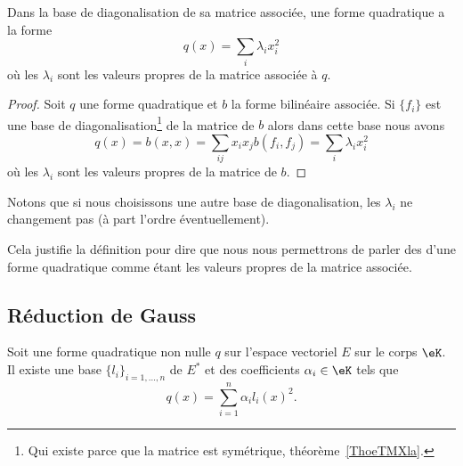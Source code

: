\begin{proposition}\label{PropFWYooQXfcVY}
    Dans la base de diagonalisation de sa matrice associée, une forme quadratique a la forme
    \begin{equation}
        q(x)=\sum_i\lambda_ix_i^2
    \end{equation}
    où les \( \lambda_i\) sont les valeurs propres de la matrice associée à \( q\).
\end{proposition}

\begin{proof}
    Soit \( q\) une forme quadratique et \( b\) la forme bilinéaire associée. Si \( \{ f_i \}\) est une base de diagonalisation\footnote{Qui existe parce que la matrice est symétrique, théorème~\ref{ThoeTMXla}.} de la matrice de \( b\) alors dans cette base nous avons
\begin{equation}
    q(x)=b(x,x)=\sum_{ij}x_ix_jb(f_i,f_j)=\sum_i\lambda_ix_i^2
\end{equation}
où les \( \lambda_i\) sont les valeurs propres de la matrice de \( b\).
\end{proof}

Notons que si nous choisissons une autre base de diagonalisation, les \( \lambda_i\) ne changement pas (à part l'ordre éventuellement). 

Cela justifie la définition pour dire que nous nous permettrons de parler des  d'une forme quadratique comme étant les valeurs propres de la matrice associée.

\subsection{Réduction de Gauss}

\begin{theorem}     \label{THOooOMMFooKxqICS}
    Soit une forme quadratique non nulle \( q\) sur l'espace vectoriel \( E\) sur le corps \( \eK\). Il existe une base  \(\{ l_i \}_{i=1,\ldots, n}\) de \( E^*\) et des coefficients \( \alpha_i\in \eK\) tels que 
        \begin{equation}
            q(x)=\sum_{i=1}^n\alpha_il_i(x)^2.
        \end{equation}
\end{theorem}

